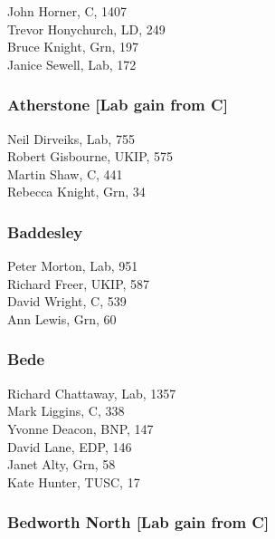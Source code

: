 \documentclass[a4paper,openany,10pt]{book}
\begin{document}
John Horner, C, 1407\\
Trevor Honychurch, LD, 249\\
Bruce Knight, Grn, 197\\
Janice Sewell, Lab, 172\\


\subsubsection*{Atherstone \hspace*{\fill}\nolinebreak[1]%
\enspace\hspace*{\fill}
[Lab gain from C]}



Neil Dirveiks, Lab, 755\\
Robert Gisbourne, UKIP, 575\\
Martin Shaw, C, 441\\
Rebecca Knight, Grn, 34\\


\subsubsection*{Baddesley}



Peter Morton, Lab, 951\\
Richard Freer, UKIP, 587\\
David Wright, C, 539\\
Ann Lewis, Grn, 60\\


\subsubsection*{Bede}



Richard Chattaway, Lab, 1357\\
Mark Liggins, C, 338\\
Yvonne Deacon, BNP, 147\\
David Lane, EDP, 146\\
Janet Alty, Grn, 58\\
Kate Hunter, TUSC, 17\\


\subsubsection*{Bedworth North \hspace*{\fill}\nolinebreak[1]%
\enspace\hspace*{\fill}
[Lab gain from C]}
\end{document}
